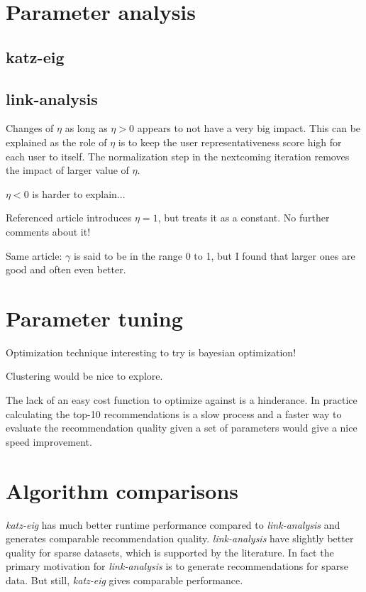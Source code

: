 \section{Parameter analysis}

\subsection{katz-eig}

\subsection{link-analysis}

Changes of $\eta$ as long as $\eta > 0$ appears to not have a very big impact. This can be explained as the role of $\eta$ is to keep the user representativeness score high for each user to itself. The normalization step in the nextcoming iteration removes the impact of larger value of $\eta$.

$\eta < 0 $ is harder to explain...

Referenced article introduces $\eta = 1$, but treats it as a constant. No further comments about it!

Same article: $\gamma$ is said to be in the range 0 to 1, but I found that larger ones are good and often even better.


\section{Parameter tuning}

Optimization technique interesting to try is bayesian optimization!

Clustering would be nice to explore.

The lack of an easy cost function to optimize against is a hinderance. In practice calculating the top-10 recommendations is a slow process and a faster way to evaluate the recommendation quality given a set of parameters would give a nice speed improvement.


\section{Algorithm comparisons}

\textit{katz-eig} has much better runtime performance compared to \textit{link-analysis} and generates comparable recommendation quality. \textit{link-analysis} have slightly better quality for sparse datasets, which is supported by the literature. In fact the primary motivation for \textit{link-analysis} is to generate recommendations for sparse data. But still, \textit{katz-eig} gives comparable performance.

